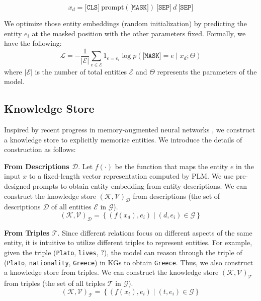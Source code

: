 \documentclass[runningheads]{llncs}
\begin{document}
$$ x_d = \texttt{[CLS]} \ \text{prompt}(\texttt{[MASK]}) \ \texttt{[SEP]} \ d \ \texttt{[SEP]}$$


We optimize those entity embeddings (random initialization) by predicting the entity $e_i$ at the masked position with the other parameters fixed. 
Formally, we have the following:
\begin{equation}
\mathcal{L}=-\frac{1}{\left| \mathcal{E} \right|} \sum_{e \in \mathcal{E}} 1_{e=e_i} \log p\left(\texttt{[MASK]}=e \mid x_d ; \Theta \right)
\label{loss}
\end{equation}
where $|\mathcal{E}|$ is the number of total entities $\mathcal{E}$ and $\Theta$ represents the parameters of the model.

\subsection{Knowledge Store}\label{sec:knowledge store}

Inspired by recent progress in memory-augmented neural networks \cite{DBLP:conf/iclr/KhandelwalLJZL20,DBLP:conf/emnlp/KassnerS20}, we construct a knowledge store to explicitly memorize entities. 
We introduce the details  of construction as follows:




\textbf{From Descriptions $\mathcal{D}$}.
Let $f(\cdot)$ be the function that maps the entity $e$ in the input $x$ to a fixed-length vector representation computed by PLM.
We use pre-designed prompts to obtain entity embedding from entity descriptions.
We can construct the knowledge store $(\mathcal{K}, \mathcal{V})_{\mathcal{D}}$ from descriptions (the set of descriptions $\mathcal{D}$ of all entities $\mathcal{E}$ in $\mathcal{G}$).
\begin{equation}
    (\mathcal{K}, \mathcal{V})_{\mathcal{D}}=\left\{\left(f\left(x_d\right), e_{i}\right) \mid\left(d, e_{i}\right) \in \mathcal{G}\right\}
\end{equation}

\textbf{From Triples $\mathcal{T}$}.
Since different relations focus on different aspects of the same entity, it is intuitive to utilize different triples to represent entities. 
For example, given the triple (\texttt{Plato}, \texttt{lives}, ?), the model can reason through the triple of (\texttt{Plato}, \texttt{nationality}, \texttt{Greece}) in KGs to obtain \texttt{Greece}.
Thus, we also construct a knowledge store from triples. 
We can construct the knowledge store $(\mathcal{K}, \mathcal{V})_{\mathcal{T}}$ from triples (the set of all triples $\mathcal{T}$ in $\mathcal{G}$).
\begin{equation}
    (\mathcal{K}, \mathcal{V})_{\mathcal{T}}=\left\{\left(f\left(x_t\right), e_{i}\right) \mid\left(t, e_{i}\right) \in \mathcal{G}\right\}
\end{equation}
\end{document}
